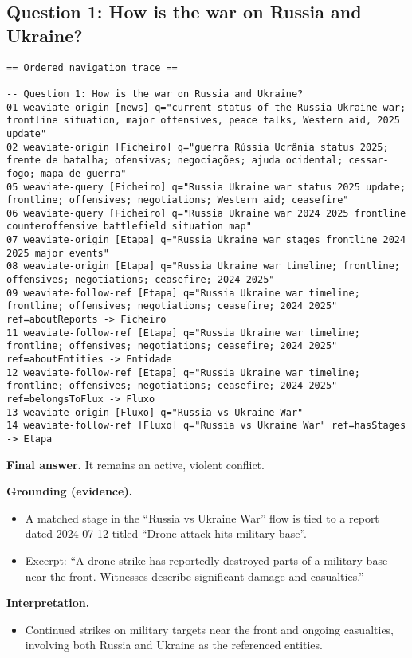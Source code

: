 \subsection*{Question 1: How is the war on Russia and Ukraine?}
\begin{lstlisting}
== Ordered navigation trace ==

-- Question 1: How is the war on Russia and Ukraine?
01 weaviate-origin [news] q="current status of the Russia-Ukraine war; frontline situation, major offensives, peace talks, Western aid, 2025 update"
02 weaviate-origin [Ficheiro] q="guerra Rússia Ucrânia status 2025; frente de batalha; ofensivas; negociações; ajuda ocidental; cessar-fogo; mapa de guerra"
05 weaviate-query [Ficheiro] q="Russia Ukraine war status 2025 update; frontline; offensives; negotiations; Western aid; ceasefire"
06 weaviate-query [Ficheiro] q="Russia Ukraine war 2024 2025 frontline counteroffensive battlefield situation map"
07 weaviate-origin [Etapa] q="Russia Ukraine war stages frontline 2024 2025 major events"
08 weaviate-origin [Etapa] q="Russia Ukraine war timeline; frontline; offensives; negotiations; ceasefire; 2024 2025"
09 weaviate-follow-ref [Etapa] q="Russia Ukraine war timeline; frontline; offensives; negotiations; ceasefire; 2024 2025" ref=aboutReports -> Ficheiro
11 weaviate-follow-ref [Etapa] q="Russia Ukraine war timeline; frontline; offensives; negotiations; ceasefire; 2024 2025" ref=aboutEntities -> Entidade
12 weaviate-follow-ref [Etapa] q="Russia Ukraine war timeline; frontline; offensives; negotiations; ceasefire; 2024 2025" ref=belongsToFlux -> Fluxo
13 weaviate-origin [Fluxo] q="Russia vs Ukraine War"
14 weaviate-follow-ref [Fluxo] q="Russia vs Ukraine War" ref=hasStages -> Etapa
\end{lstlisting}

\noindent\textbf{Final answer.} It remains an active, violent conflict.

\noindent\textbf{Grounding (evidence).}
\begin{itemize}
	\item A matched stage in the \enquote{Russia vs Ukraine War} flow is tied to a report dated 2024-07-12 titled \enquote{Drone attack hits military base}.
	\item Excerpt: \enquote{A drone strike has reportedly destroyed parts of a military base near the front. Witnesses describe significant damage and casualties.}
\end{itemize}

\noindent\textbf{Interpretation.}
\begin{itemize}
	\item Continued strikes on military targets near the front and ongoing casualties, involving both Russia and Ukraine as the referenced entities.
\end{itemize}

